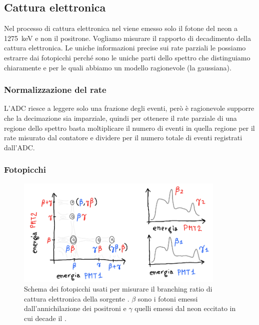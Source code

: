 \subsection{Cattura elettronica}

Nel processo di cattura elettronica nel \na{}
viene emesso solo il fotone del neon a \SI{1275}{keV} e non il positrone.
Vogliamo misurare il rapporto di decadimento della cattura elettronica.
Le uniche informazioni precise sui rate parziali le possiamo estrarre dai fotopicchi
perché sono le uniche parti dello spettro che distinguiamo chiaramente
e per le quali abbiamo un modello ragionevole (la gaussiana).

\subsubsection{Normalizzazione del rate}

L'ADC riesce a leggere solo una frazione degli eventi,
però è ragionevole supporre che la decimazione sia imparziale,
quindi per ottenere il rate parziale di una regione dello spettro
basta moltiplicare il numero di eventi in quella regione
per il rate misurato dal contatore
e dividere per il numero totale di eventi registrati dall'ADC.

\subsubsection{Fotopicchi}

\begin{figure}
	\centering
	\includegraphics[width=27em]{immagini/schemapicchi}
	\caption{\label{fig:schemapicchi}
	Schema dei fotopicchi usati per misurare il branching ratio di cattura elettronica della sorgente \na{}.
	$\beta$ sono i fotoni emessi dall'annichilazione dei positroni
	e $\gamma$ quelli emessi dal neon eccitato in cui decade il \na.}
\end{figure}

